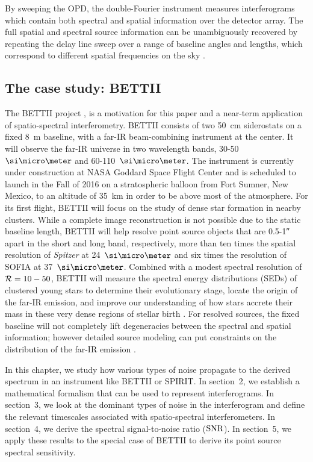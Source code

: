 By sweeping the OPD, the double-Fourier instrument measures interferograms which contain both spectral and spatial information over the detector array. The full spatial and spectral source information can be unambiguously recovered by repeating the delay line sweep over a range of baseline angles and lengths, which correspond to different spatial frequencies on the sky \citep{Mariotti:1988vea}.


\subsection{The case study: BETTII}

The BETTII project \citep{Rinehart:2014gk}, is a motivation for this paper and a near-term application of spatio-spectral interferometry. BETTII consists of two 50~cm siderostats on a fixed 8~m baseline, with a far-IR beam-combining instrument at the center. It will observe the far-IR universe in two 
wavelength bands, 30-50~$\um$ and 60-110~$\um$. The instrument is currently under construction at NASA Goddard Space Flight Center and is scheduled to launch in the Fall of 2016 on a stratospheric balloon from Fort Sumner, New Mexico, to an altitude of 35~km in order to be above most of the atmosphere. For its first flight, BETTII will focus on the study of dense star formation in nearby clusters. While a complete image reconstruction is not possible due to the static baseline length, BETTII will help resolve point source objects that are 0.5-\ang{;;1} apart in the short and long band, respectively, more than ten times the spatial resolution of \textit{Spitzer} at 24~$\um$ and six times the resolution of SOFIA at 37~$\um$.  Combined with a modest spectral resolution of $\mathcal{R}=10 - 50$, BETTII will measure the spectral energy distributions (SEDs) of clustered young stars to determine their evolutionary stage, locate the origin of the far-IR emission, and improve our understanding of how stars accrete their mass in these very dense regions of stellar birth \citep[e.g. see][and references therein]{2014prpl.conf..149T}. For resolved sources, the fixed baseline will not completely lift degeneracies between the spectral and spatial information; however detailed source modeling can put constraints on the distribution of the far-IR emission
\citep[e.g][]{Whitney:2013cw}.

In this chapter, we study how various types of noise propagate to the derived spectrum in an
instrument like BETTII or SPIRIT. In section~2, we establish a mathematical formalism that can be used to represent interferograms. In section~3, we look at the dominant types of noise in the interferogram and define the relevant timescales associated with spatio-spectral interferometers. In section~4, we derive the spectral signal-to-noise ratio ($\textrm{SNR}$). In section~5, we apply these results to the special case of BETTII to derive its point source spectral sensitivity.

